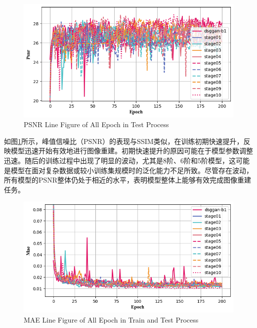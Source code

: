 \documentclass[twocolumn]{article}
\begin{document}
\begin{figure}[h]
	\centering
	\includegraphics[width=1.0\linewidth]{u-net/lung/csv_stage01_10_dsg_lung_evalu_csv_img_2025_04_06_15_44_18/psnr_comparison}
	\caption[psnr]{PSNR Line Figure of All Epoch in Test Process}
	\label{fig:psnr}
\end{figure}


如图\ref{fig:psnr}所示，峰值信噪比（PSNR）的表现与SSIM类似，在训练初期快速提升，反映模型迅速开始有效地进行图像重建。初期快速提升的原因可能在于模型参数调整迅速。随后的训练过程中出现了明显的波动，尤其是8阶、6阶和5阶模型，这可能是模型在面对复杂数据或较小训练集规模时的泛化能力不足所致。尽管存在波动，所有模型的PSNR整体仍处于相近的水平，表明模型整体上能够有效完成图像重建任务。

\begin{figure}[h]
	\centering
	\includegraphics[width=1.0\linewidth]{u-net/lung/csv_stage01_10_dsg_lung_evalu_csv_img_2025_04_06_15_44_18/mae_comparison}
	\caption[mae]{MAE Line Figure of All Epoch in Train and Test Process}
	\label{fig:mae}
\end{figure}
\end{document}
